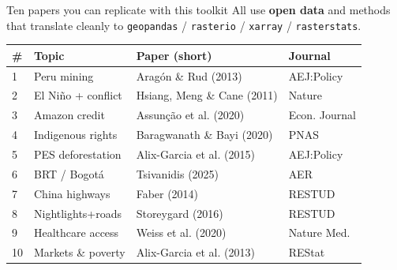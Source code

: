 \documentclass[10pt,aspectratio=169]{beamer}
\begin{document}
\begin{frame}{Ten papers you can replicate with this toolkit}
  \small
  All use \textbf{open data} and methods that translate cleanly to
  \texttt{geopandas} / \texttt{rasterio} / \texttt{xarray} / \texttt{rasterstats}.
  \vspace{0.4em}

  \begin{tabular}{@{}p{0.4cm}p{3.6cm}p{6.6cm}p{2.6cm}@{}}
    \toprule
    \# & Topic & Paper (short) & Journal \\
    \midrule
    1  & Peru mining        & Arag\'on \& Rud (2013)                & AEJ:Policy \\
    2  & El Ni\~no + conflict & Hsiang, Meng \& Cane (2011)         & Nature \\
    3  & Amazon credit      & Assun\c{c}\~ao et al. (2020)          & Econ. Journal \\
    4  & Indigenous rights  & Baragwanath \& Bayi (2020)            & PNAS \\
    5  & PES deforestation  & Alix-Garcia et al. (2015)             & AEJ:Policy \\
    6  & BRT / Bogot\'a     & Tsivanidis (2025)                     & AER \\
    7  & China highways     & Faber (2014)                          & RESTUD \\
    8  & Nightlights+roads  & Storeygard (2016)                     & RESTUD \\
    9  & Healthcare access  & Weiss et al. (2020)                   & Nature Med. \\
    10 & Markets \& poverty & Alix-Garcia et al. (2013)             & REStat \\
    \bottomrule
  \end{tabular}
\end{frame}
\end{document}
